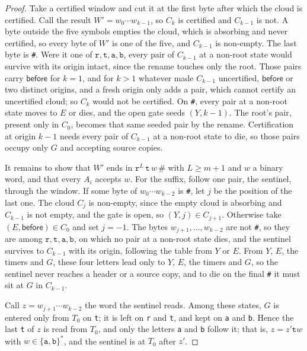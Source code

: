 \documentclass[11pt,a4paper]{article}
\theoremstyle{definition}
\theoremstyle{plain}
\newcommand{\code}[1]{\texttt{#1}}
\newcommand{\before}{\mathsf{before}}
\begin{document}
\begin{proof}
Take a certified window and cut it at the first byte after which the cloud is certified. Call the result
$W' = w_0 \cdots w_{k-1}$, so $C_k$ is certified and $C_{k-1}$ is not. A byte outside the five symbols empties the
cloud, which is absorbing and never certified, so every byte of $W'$ is one of the five, and $C_{k-1}$ is non-empty. The
last byte is \code{\#}. Were it one of $\code{r}, \code{t}, \code{a}, \code{b}$, every pair of $C_{k-1}$ at a non-root
state would survive with its origin intact, since the rename touches only the root. Those pairs carry $\before$ for
$k = 1$, and for $k > 1$ whatever made $C_{k-1}$ uncertified, $\before$ or two distinct origins, and a fresh origin only
adds a pair, which cannot certify an uncertified cloud; so $C_k$ would not be certified. On \code{\#}, every pair at a
non-root state moves to $E$ or dies, and the open gate seeds $(Y, k - 1)$. The root's pair, present only in $C_0$,
becomes that same seeded pair by the rename. Certification at origin $k - 1$ needs every pair of $C_{k-1}$ at a non-root
state to die, so those pairs occupy only $G$ and accepting source copies.

It remains to show that $W'$ ends in $\code{r}^{L}\, \code{t}\, w\, \code{\#}$ with $L \geq m + 1$ and $w$ a binary
word, and that every $A_i$ accepts $w$. For the suffix, follow one pair, the sentinel, through the window. If some byte
of $w_0 \cdots w_{k-2}$ is \code{\#}, let $j$ be the position of the last one. The cloud $C_j$ is non-empty, since the
empty cloud is absorbing and $C_{k-1}$ is not empty, and the gate is open, so $(Y, j) \in C_{j+1}$. Otherwise take
$(E, \before) \in C_0$ and set $j = -1$. The bytes $w_{j+1}, \ldots, w_{k-2}$ are not \code{\#}, so they are among
$\code{r}, \code{t}, \code{a}, \code{b}$, on which no pair at a non-root state dies, and the sentinel survives to
$C_{k-1}$ with its origin, following the table from $Y$ or $E$. From $Y$, $E$, the timers and $G$, these four letters
lead only to $Y$, $E$, the timers and $G$, so the sentinel never reaches a header or a source copy, and to die on the
final \code{\#} it must sit at $G$ in $C_{k-1}$.

Call $z = w_{j+1} \cdots w_{k-2}$ the word the sentinel reads. Among these states, $G$ is entered only from $T_0$ on
\code{t}; it is left on \code{r} and \code{t}, and kept on \code{a} and \code{b}. Hence the last \code{t} of $z$ is read
from $T_0$, and only the letters \code{a} and \code{b} follow it; that is, $z = z' \code{t} w$ with
$w \in \{\code{a}, \code{b}\}^*$, and the sentinel is at $T_0$ after $z'$.


\end{proof}
\end{document}
